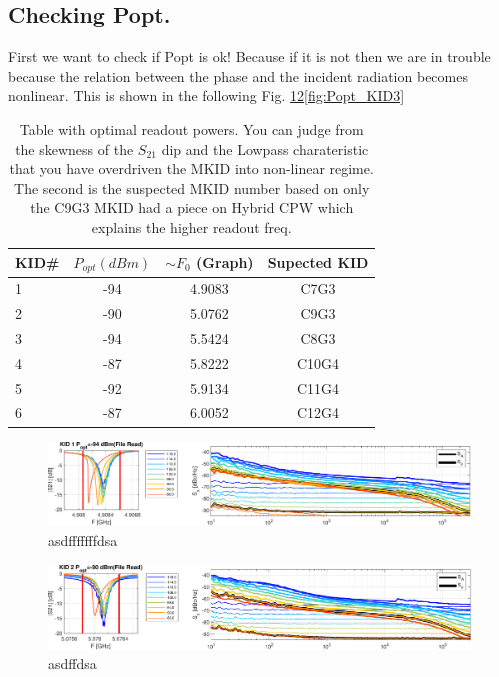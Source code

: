 \subsection*{Checking Popt.}
First we want to check if Popt is ok! Because if it is not then we are in trouble because the relation between the phase and the incident radiation becomes nonlinear.
This is shown in the following Fig. \ref{fig:Popt_KID1}\ref{fig:Popt_KID2}\ref{fig:Popt_KID3}
\begin{table}[ht]
    \centering
    \begin{tabular}[t]{lccc}
    \hline
    KID\# & $ P_{opt} (dBm) $ & $ \sim F_{0}$ (Graph) & Supected KID \\
    \hline
    1 & -94 & 4.9083 & C7G3\\
   	2 & -90 & 5.0762 & C9G3 \\
    3 & -94 & 5.5424 & C8G3 \\
	4 & -87 & 5.8222 & C10G4 \\
    5 & -92 & 5.9134 & C11G4 \\
    6 & -87 & 6.0052 & C12G4 \\
    \hline
    \end{tabular}
    \caption{Table with optimal readout powers. You can judge from the skewness of the $S_{21}$ dip and the Lowpass charateristic that you have overdriven the MKID into non-linear regime. The second is the suspected MKID number based on only the C9G3 MKID had a piece on Hybrid CPW which explains the higher readout freq.}
    \label{tab:}
\end{table}%


\begin{figure}[h!!!!!]
	\centering
	\includegraphics[width=\linewidth]{figures/chA_Appendix/Popt_KID1.pdf}
	\caption{asdfffffffdsa}
	\label{fig:Popt_KID1}
\end{figure}

\begin{figure}[h!!!!!]
	\centering
	\includegraphics[width=\linewidth]{figures/chA_Appendix/Popt_KID2.pdf}
	\caption{asdffdsa}
	\label{fig:Popt_KID2}
\end{figure}

